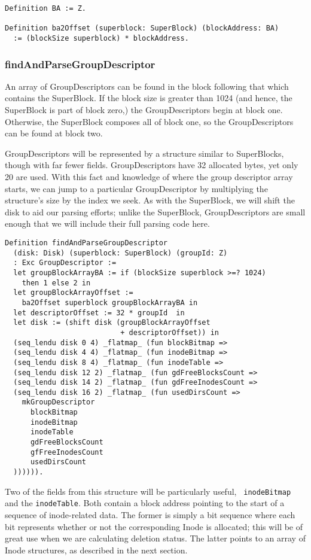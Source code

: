 \documentclass[nocopyrightspace]{sigplanconf}
\begin{document}
\begin{lstlisting}
Definition BA := Z.

Definition ba2Offset (superblock: SuperBlock) (blockAddress: BA)
  := (blockSize superblock) * blockAddress.
\end{lstlisting}

\subsubsection{findAndParseGroupDescriptor}
An array of GroupDescriptors can be found in the block following that which
contains the SuperBlock. If the block size is greater than 1024 (and hence,
the SuperBlock is part of block zero,) the GroupDescriptors begin at block
one. Otherwise, the SuperBlock composes all of block one, so the
GroupDescriptors can be found at block two.

GroupDescriptors will be represented by a structure similar to SuperBlocks,
though with far fewer fields. GroupDescriptors have 32 allocated bytes, yet
only 20 are used. With this fact and knowledge of where the group descriptor
array starts, we can jump to a particular GroupDescriptor by multiplying the
structure's size by the index we seek. As with the SuperBlock, we will shift
the disk to aid our parsing efforts; unlike the SuperBlock, GroupDescriptors
are small enough that we will include their full parsing code here.

\begin{lstlisting}
Definition findAndParseGroupDescriptor 
  (disk: Disk) (superblock: SuperBlock) (groupId: Z)
  : Exc GroupDescriptor :=
  let groupBlockArrayBA := if (blockSize superblock >=? 1024)
    then 1 else 2 in
  let groupBlockArrayOffset := 
    ba2Offset superblock groupBlockArrayBA in
  let descriptorOffset := 32 * groupId  in
  let disk := (shift disk (groupBlockArrayOffset 
                           + descriptorOffset)) in
  (seq_lendu disk 0 4) _flatmap_ (fun blockBitmap =>
  (seq_lendu disk 4 4) _flatmap_ (fun inodeBitmap =>
  (seq_lendu disk 8 4) _flatmap_ (fun inodeTable =>
  (seq_lendu disk 12 2) _flatmap_ (fun gdFreeBlocksCount =>
  (seq_lendu disk 14 2) _flatmap_ (fun gdFreeInodesCount =>
  (seq_lendu disk 16 2) _flatmap_ (fun usedDirsCount =>
    mkGroupDescriptor
      blockBitmap
      inodeBitmap
      inodeTable
      gdFreeBlocksCount
      gfFreeInodesCount
      usedDirsCount
  )))))).
\end{lstlisting}

Two of the fields from this structure will be particularly useful, {\tt
inodeBitmap} and the {\tt inodeTable}. Both contain a block address pointing
to the start of a sequence of inode-related data. The former is simply a bit
sequence where each bit represents whether or not the corresponding Inode is
allocated; this will be of great use when we are calculating deletion status.
The latter points to an array of Inode structures, as described in the next
section.
\end{document}
